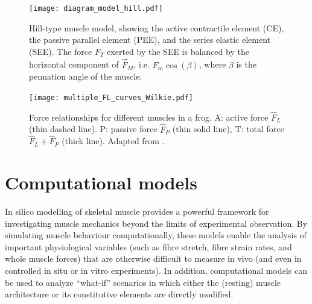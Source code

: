 \documentclass{sfuthesis}
\numberwithin{equation}{section}
\numberwithin{figure}{chapter}
\numberwithin{table}{chapter}
\theoremstyle{definition}
\begin{document}
\begin{figure}
    \centering
    \texttt{[image: diagram\_model\_hill.pdf]}
    \caption{Hill-type muscle model, showing the active contractile element (CE), the passive parallel element (PEE), and the series elastic element (SEE). The force $F_T$ exerted by the SEE is balanced by the horizontal component of $\vec{F}_M$, i.e. $F_m \cos(\beta)$, where $\beta$ is the pennation angle of the muscle.\label{fig:diagram_hill}}
\end{figure}

\begin{figure}
    \centering
    \texttt{[image: multiple\_FL\_curves\_Wilkie.pdf]}
    \caption{Force relationships for different muscles in a frog. A: active force $\widehat{F}_L$ (thin dashed line). P: passive force $\widehat{F}_P$ (thin solid line), T: total force $\widehat{F}_L + \widehat{F}_P$ (thick line). Adapted from \cite{RassierMacintoshHerzog1999}.
    \label{fig:fl_curves_wilkie}}
\end{figure}


\section{Computational models}

In silico modelling of skeletal muscle provides a powerful framework for investigating muscle mechanics beyond the limits of experimental observation. By simulating muscle behaviour computationally, these models enable the analysis of important physiological variables (such as fibre stretch, fibre strain rates, and whole muscle forces) that are otherwise difficult to measure in vivo (and even in controlled in situ or in vitro experiments). In addition, computational models can be used to analyze ``what-if'' scenarios in which either the (resting) muscle architecture or its constitutive elements are directly modified.
\end{document}
